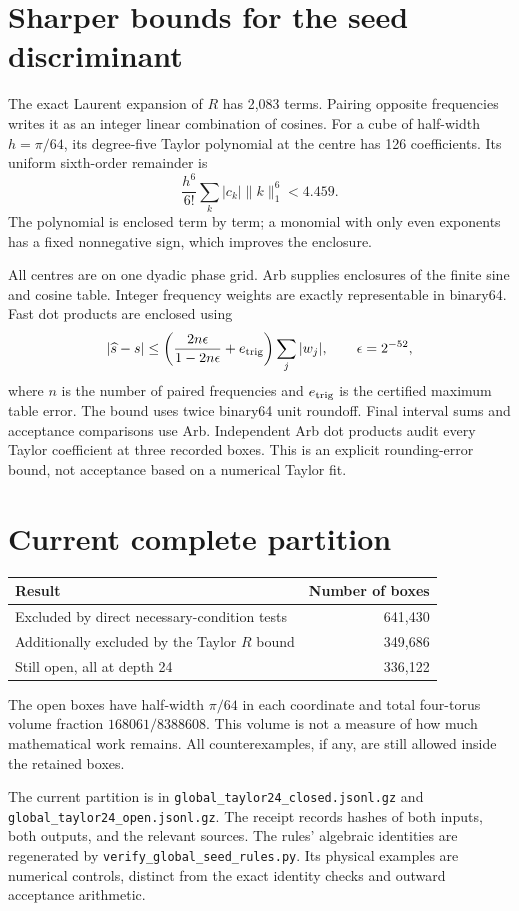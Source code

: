 \documentclass[11pt]{article}
\begin{document}
\section*{Sharper bounds for the seed discriminant}
The exact Laurent expansion of $R$ has 2,083 terms. Pairing opposite
frequencies writes it as an integer linear combination of cosines.
For a cube of half-width $h=\pi/64$, its degree-five Taylor polynomial
at the centre has 126 coefficients. Its uniform sixth-order remainder is
\[
 \frac{h^6}{6!}\sum_k |c_k|\|k\|_1^6
 <4.459.
\]
The polynomial is enclosed term by term; a monomial with only even
exponents has a fixed nonnegative sign, which improves the enclosure.

All centres are on one dyadic phase grid. Arb supplies enclosures of the
finite sine and cosine table. Integer frequency weights are exactly
representable in binary64. Fast dot products are enclosed using
\[
 |\widehat s-s|\le
 \left(\frac{2n\epsilon}{1-2n\epsilon}+e_{\rm trig}\right)
 \sum_j|w_j|,\qquad \epsilon=2^{-52},
\]
where $n$ is the number of paired frequencies and $e_{\rm trig}$ is the
certified maximum table error. The bound uses twice binary64 unit roundoff.
Final interval sums and acceptance comparisons use Arb. Independent Arb
dot products audit every Taylor coefficient at three recorded boxes.
This is an explicit rounding-error bound, not acceptance based on a
numerical Taylor fit.

\section*{Current complete partition}
\begin{center}
\begin{tabular}{lr}\toprule
Result&Number of boxes\\\midrule
Excluded by direct necessary-condition tests&641,430\\
Additionally excluded by the Taylor $R$ bound&349,686\\
Still open, all at depth 24&336,122\\\bottomrule
\end{tabular}
\end{center}
The open boxes have half-width $\pi/64$ in each coordinate and total
four-torus volume fraction $168061/8388608$. This volume is not a measure
of how much mathematical work remains. All counterexamples, if any,
are still allowed inside the retained boxes.

The current partition is in
\texttt{global\_taylor24\_closed.jsonl.gz} and
\texttt{global\_taylor24\_open.jsonl.gz}. The receipt records hashes of
both inputs, both outputs, and the relevant sources. The rules' algebraic
identities are regenerated by \texttt{verify\_global\_seed\_rules.py}.
Its physical examples are numerical controls, distinct from the exact
identity checks and outward acceptance arithmetic.
\end{document}

